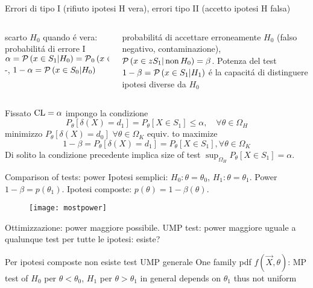 \begin{frame}{Errori di tipo I (rifiuto ipotesi H vera), errori tipo II (accetto ipotesi H falsa)}
\begin{columns}[T]
\begin{column}{0.45\textwidth}
\begin{block}{ }
scarto $H_0$ quando \'e vera: probabilit\'a di errore I $\alpha=\operatorname{\mathcal{P}}{(x\in S_1|H_0)}=\operatorname{\mathcal{P}}_0{(x\in S_1)}$-,  $1-\alpha=\operatorname{\mathcal{P}}{(x\in S_0|H_0)}$
\end{block}
\end{column}
\begin{column}{0.55\textwidth}
\begin{block}{}
probabilit\'a di accettare erroneamente $H_0$ (falso negativo, contaminazione), $\operatorname{\mathcal{P}}{(x\in zS_1|\operatorname{non}{H_0})}=\beta$. Potenza del test $1-\beta=\operatorname{\mathcal{P}}{(x\in S_1|H_1)}$ \'e la capacit\'a di distinguere ipotesi diverse da $H_0$ 
\end{block}
\end{column}
\end{columns}
Fissato $\operatorname{CL}=\alpha$ impongo la condizione \[P_{\theta}[\delta(X)=d_1]=P_{\theta}[X\in S_1]\leq\alpha,\quad \forall\theta\in\Omega_H\]
minimizzo $P_{\theta}[\delta(X)=d_0]$ $\forall\theta\in\Omega_K$ equiv. to maximize
\[1-\beta=P_{\theta}[\delta(X)=d_1]=P_{\theta}[X\in S_1], \forall\theta\in\Omega_K\]
Di solito la condizione precedente implica size of test $\sup_{\Omega_H}{P_{\theta}[X\in S_1]}=\alpha$.
\end{frame}

\begin{frame}{Comparison of tests: power}
Ipotesi semplici: $H_0: \theta=\theta_0$, $H_1: \theta=\theta_1$. Power $1-\beta=p(\theta_1)$.
Ipotesi composte: $p(\theta)=1-\beta(\theta)$.
\begin{figure}[!ht]\texttt{[image: mostpower]}\label{fig:mostpower}\end{figure}
\begin{block}{Ottimizzazione: power maggiore possibile.}
	UMP test: power maggiore uguale a qualunque test per tutte le ipotesi: esiste?
\end{block}
\begin{block}{Per ipotesi composte non esiste test UMP generale}
	One family pdf $f(\vec{X},\theta)$: MP test of $H_0$ per $\theta<\theta_0$, $H_1$ per $\theta>\theta_1$ in general depends on $\theta_1$ thus not uniform
\end{block}
\end{frame}

